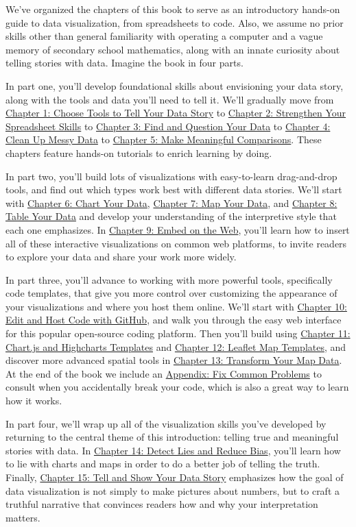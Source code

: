\documentclass[
  english,
]{book}
\begin{document}
We've organized the chapters of this book to serve as an introductory hands-on guide to data visualization, from spreadsheets to code. Also, we assume no prior skills other than general familiarity with operating a computer and a vague memory of secondary school mathematics, along with an innate curiosity about telling stories with data. Imagine the book in four parts.

In part one, you'll develop foundational skills about envisioning your data story, along with the tools and data you'll need to tell it. We'll gradually move from \href{choose.html}{Chapter 1: Choose Tools to Tell Your Data Story} to \href{spreadsheet.html}{Chapter 2: Strengthen Your Spreadsheet Skills} to \href{find.html}{Chapter 3: Find and Question Your Data} to \href{clean.html}{Chapter 4: Clean Up Messy Data} to \href{comparisons.html}{Chapter 5: Make Meaningful Comparisons}. These chapters feature hands-on tutorials to enrich learning by doing.

In part two, you'll build lots of visualizations with easy-to-learn drag-and-drop tools, and find out which types work best with different data stories. We'll start with \href{chart.html}{Chapter 6: Chart Your Data}, \href{map.html}{Chapter 7: Map Your Data}, and \href{table.html}{Chapter 8: Table Your Data} and develop your understanding of the interpretive style that each one emphasizes. In \href{embed.html}{Chapter 9: Embed on the Web}, you'll learn how to insert all of these interactive visualizations on common web platforms, to invite readers to explore your data and share your work more widely.

In part three, you'll advance to working with more powerful tools, specifically code templates, that give you more control over customizing the appearance of your visualizations and where you host them online. We'll start with \href{github.html}{Chapter 10: Edit and Host Code with GitHub}, and walk you through the easy web interface for this popular open-source coding platform. Then you'll build using \href{chartcode.html}{Chapter 11: Chart.js and Highcharts Templates} and \href{leaflet.html}{Chapter 12: Leaflet Map Templates}, and discover more advanced spatial tools in \href{transform.html}{Chapter 13: Transform Your Map Data}. At the end of the book we include an \href{fix.html}{Appendix: Fix Common Problems} to consult when you accidentally break your code, which is also a great way to learn how it works.

In part four, we'll wrap up all of the visualization skills you've developed by returning to the central theme of this introduction: telling true and meaningful stories with data. In \href{detect.html}{Chapter 14: Detect Lies and Reduce Bias}, you'll learn how to lie with charts and maps in order to do a better job of telling the truth. Finally, \href{story.html}{Chapter 15: Tell and Show Your Data Story} emphasizes how the goal of data visualization is not simply to make pictures about numbers, but to craft a truthful narrative that convinces readers how and why your interpretation matters.
\end{document}
